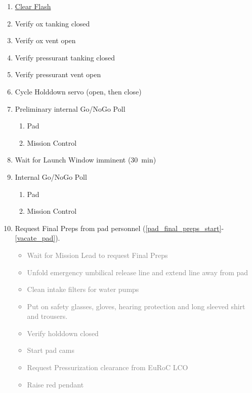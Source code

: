 \begin{enumerate}[label=L\arabic*.]
    \item \underline{Clear Flash}\checkbox
    \newpage
    \item Verify ox tanking closed\checkbox    
    \item Verify ox vent open\checkbox    
    \item Verify pressurant tanking closed\checkbox    
    \item Verify pressurant vent open\checkbox
    \item Cycle Holddown servo (open, then close)\checkbox
    \item Preliminary internal Go/NoGo Poll\checkbox
        \begin{enumerate}[label*=\arabic*.]
            \item Pad \leftcheckbox
            \item Mission Control \leftcheckbox
        \end{enumerate}
    \item Wait for Launch Window imminent (\SI{30}{\minute})\checkbox
    \item Internal Go/NoGo Poll\checkbox
        \begin{enumerate}[label*=\arabic*.]
            \item Pad \leftcheckbox
            \item Mission Control \leftcheckbox
        \end{enumerate}
    \item Request Final Preps from pad personnel (\ref{pad_final_preps_start}-\ref{vacate_pad}).\checkbox
    \textcolor{gray}{\begin{itemize}
        \item Wait for Mission Lead to request Final Preps\leftcheckbox
        \item Unfold emergency umbilical release line and extend line away from pad \leftcheckbox
        \item Clean intake filters for water pumps \leftcheckbox
        \item Put on safety glasses, gloves, hearing protection and long sleeved shirt and trousers.\leftcheckbox
        \item Verify holddown closed\leftcheckbox
        \item Start pad cams\leftcheckbox
        \item Request Pressurization clearance from EuRoC LCO\leftcheckbox
        \item Raise red pendant\leftcheckbox

\end{itemize}}
\end{enumerate}
